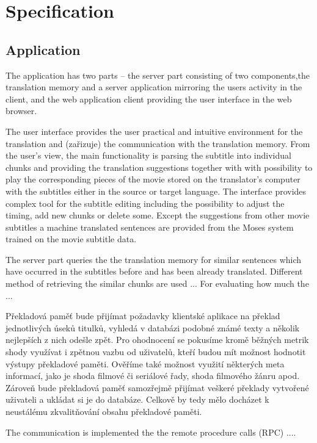 \chapter{Specification}

\section{Application}

The application has two parts -- the server part consisting of  two components,the translation memory and a server application mirroring the users activity in the client, and the web application client providing the user interface in the web browser.

The user interface provides the user practical and intuitive environment for the translation and (zařizuje) the communication with the translation memory. From the user's view, the main functionality is parsing the subtitle into individual chunks and providing the translation suggestions together with with possibility to play the corresponding pieces of the movie stored on the translator's computer with the subtitles either in the source or target language. The interface provides complex tool for the subtitle editing including the possibility to adjust the timing, add new chunks or delete some. Except the suggestions from other movie subtitles a machine translated sentences are provided from the Moses system trained on the movie subtitle data.

The server part queries the the translation memory for similar sentences which have occurred in the subtitles before and has been already translated. Different method of retrieving the similar chunks are used ... For evaluating how much the ...

Překladová paměť bude přijímat požadavky klientské aplikace na překlad jednotlivých úseků titulků, vyhledá v databázi podobné známé texty a několik nejlepších z nich odešle zpět. Pro ohodnocení se pokusíme kromě běžných metrik shody využívat i zpětnou vazbu od uživatelů, kteří budou mít možnost hodnotit výstupy překladové paměti. Ověříme také možnost využití některých meta informací, jako je shoda filmové či seriálové řady, shoda filmového žánru apod. Zároveň bude překladová paměť samozřejmě přijímat veškeré překlady vytvořené uživateli a ukládat si je do databáze. Celkově by tedy mělo docházet k neustálému zkvalitňování obsahu překladové paměti. 

 The communication is implemented the the remote procedure calls (RPC) ....

